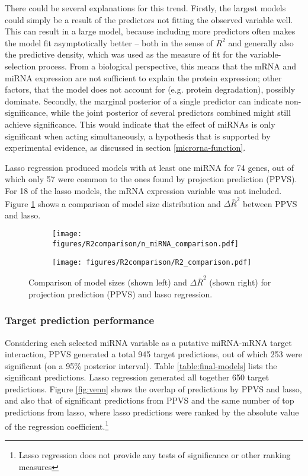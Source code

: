 There could be several explanations for this trend. Firstly, the largest
models could simply be a result of the predictors not fitting the observed
variable well. This can result in a large model, because including more
predictors often makes the model fit asymptotically better -- both in the
sense of $R^2$ and generally also the predictive density, which was used as
the measure of fit for the variable-selection process. From a biological
perspective, this means that the mRNA and miRNA expression are not sufficient
to explain the protein expression; other factors, that the model does not
account for (e.g. protein degradation), possibly dominate.
Secondly, the marginal posterior of a single predictor can indicate
non-significance, while the joint posterior of several predictors combined
might still achieve significance. This would indicate that the effect of
miRNAs is only significant when acting simultaneously, a hypothesis that is
supported by experimental evidence, as discussed in section
\ref{microrna-function}.

Lasso regression produced models with at least one miRNA for 74 genes, out of
which only 57 were common to the ones found by projection prediction (PPVS).
For 18 of the lasso models, the mRNA expression variable was not included.
Figure \ref{fig:model-size} shows a comparison of model size distribution
and $\Delta\bar{R}^2$ between PPVS and lasso.

\begin{figure}[!h]
  \centering
  \begin{subfigure}{.45\textwidth}
    \texttt{[image: figures/R2comparison/n\_miRNA\_comparison.pdf]}
  \end{subfigure}
  \begin{subfigure}{.45\textwidth}
    \texttt{[image: figures/R2comparison/R2\_comparison.pdf]}
  \end{subfigure}

  \caption{Comparison of model sizes (shown left) and $\Delta\bar{R}^2$ (shown right) for
      projection prediction (PPVS) and lasso regression.}
  \label{fig:model-size}
\end{figure}




\subsubsection*{Target prediction performance}

Considering each selected miRNA variable as a putative miRNA-mRNA target
interaction, PPVS generated a total 945 target predictions, out of which
253 were significant (on a 95\% posterior interval). Table \ref{table:final-models}
lists the significant predictions.
Lasso regression generated all together 650 target predictions. Figure
\ref{fig:venn} shows the overlap of predictions by PPVS and lasso, and also
that of significant predictions from PPVS and the same number of top
predictions from lasso, where lasso predictions were ranked by the absolute value of
the regression coefficient.\footnote{Lasso regression does not provide any tests of
significance or other ranking measures}

